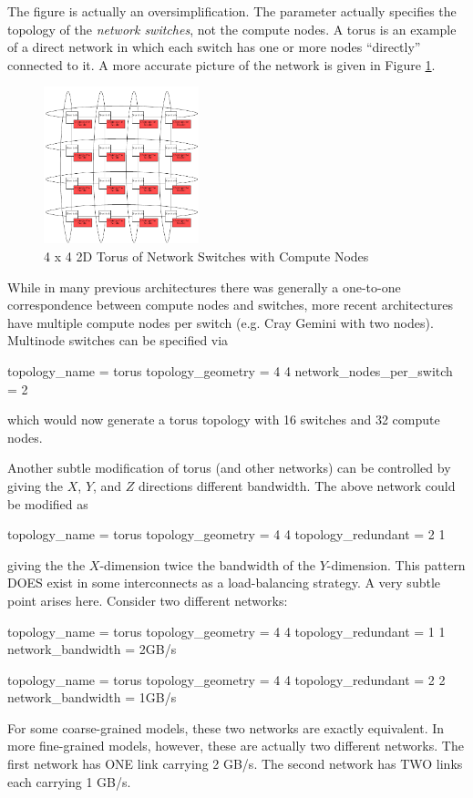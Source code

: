 The figure is actually an oversimplification.  
The  parameter actually specifies the topology of the \emph{network switches}, not the compute nodes. 
A torus is an example of a direct network in which each switch has one or more nodes ``directly'' connected to it.  
A more accurate picture of the network is given in Figure \ref{fig:hdtorus:withnodes}.
\begin{figure}[h]
\centering
\includegraphics[width=0.4\textwidth]{figures/tikz/torus/withnodes.pdf}
\caption{4 x 4 2D Torus of Network Switches with Compute Nodes}
\label{fig:hdtorus:withnodes}
\end{figure}
While in many previous architectures there was generally a one-to-one correspondence between compute nodes and switches, more recent architectures have multiple compute nodes per switch (e.g. Cray Gemini with two nodes).  
Multinode switches can be specified via

\begin{ViFile}
topology_name = torus
topology_geometry = 4 4
network_nodes_per_switch = 2
\end{ViFile}
which would now generate a torus topology with 16 switches and 32 compute nodes.

Another subtle modification of torus (and other networks) can be controlled by giving the $X$, $Y$, and $Z$ directions different bandwidth.  
The above network could be modified as

\begin{ViFile}
topology_name = torus
topology_geometry = 4 4
topology_redundant = 2 1
\end{ViFile}
giving the the $X$-dimension twice the bandwidth of the $Y$-dimension.  
This pattern DOES exist in some interconnects as a load-balancing strategy.  
A very subtle point arises here. Consider two different networks:

\begin{ViFile}
topology_name = torus
topology_geometry = 4 4
topology_redundant = 1 1
network_bandwidth = 2GB/s
\end{ViFile}
\begin{ViFile}
topology_name = torus
topology_geometry = 4 4
topology_redundant = 2 2
network_bandwidth = 1GB/s
\end{ViFile}
For some coarse-grained models, these two networks are exactly equivalent.  
In more fine-grained models, however, these are actually two different networks.  
The first network has ONE link carrying 2 GB/s. The second network has TWO links each carrying 1 GB/s.

